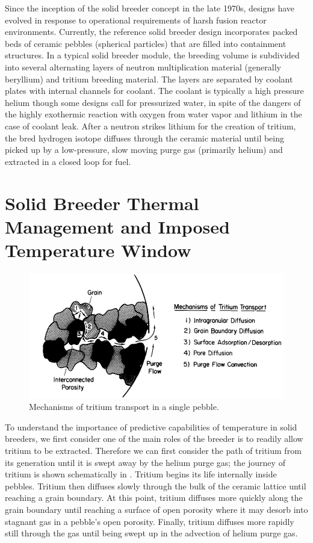 Since the inception of the solid breeder concept in the late 1970s, designs have evolved in response to operational requirements of harsh fusion reactor environments. Currently, the reference solid breeder design incorporates packed beds of ceramic pebbles (spherical particles) that are filled into containment structures. In a typical solid breeder module, the breeding volume is subdivided into several alternating layers of neutron multiplication material (generally beryllium) and tritium breeding material. The layers are separated by coolant plates with internal channels for coolant. The coolant is typically a high pressure helium though some designs call for pressurized water, in spite of the dangers of the highly exothermic reaction with oxygen from water vapor and lithium in the case of coolant leak. After a neutron strikes lithium for the creation of tritium, the bred hydrogen isotope diffuses through the ceramic material until being picked up by a low-pressure, slow moving purge gas (primarily helium) and extracted in a closed loop for fuel.


\section{Solid Breeder Thermal Management and Imposed Temperature Window}

\begin{figure}[ht]
    \centering
    \includegraphics[width=\singleimagewidth]{figures/mechanisms_tritium_transport} 
    \caption{Mechanisms of tritium transport in a single pebble\cite{Federici1990}.}
    \label{fig:mechanisms_tritium_transport}
\end{figure}

To understand the importance of predictive capabilities of temperature in solid breeders, we first consider one of the main roles of the breeder is to readily allow tritium to be extracted. Therefore we can first consider the path of tritium from its generation until it is swept away by the helium purge gas; the journey of tritium is shown schematically in . Tritium begins its life internally inside pebbles. Tritium then diffuses slowly through the bulk of the ceramic lattice until reaching a grain boundary. At this point, tritium diffuses more quickly along the grain boundary until reaching a surface of open porosity where it may desorb into stagnant gas in a pebble's open porosity. Finally, tritium diffuses more rapidly still through the gas until being swept up in the advection of helium purge gas.\cite{Federici1990} 

